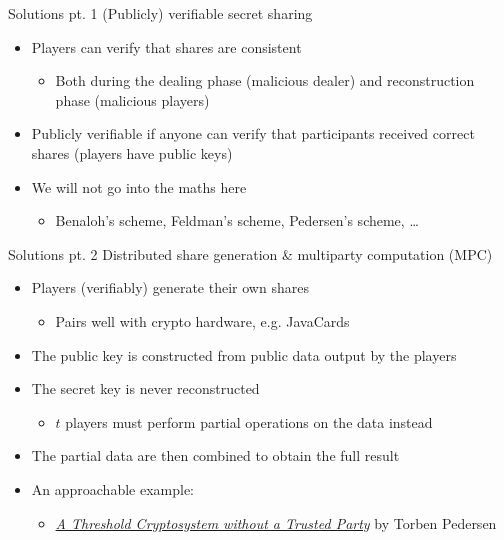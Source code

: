 \begin{frame}{Solutions pt. 1}
  (Publicly) verifiable secret sharing
  \begin{itemize}[<+(1)->]
    \item Players can verify that shares are consistent
    \par
    \begin{itemize}
      \item Both during the dealing phase (malicious dealer) and reconstruction phase (malicious players)
    \end{itemize}
    \item Publicly verifiable if anyone can verify that participants received correct shares (players have public keys)
    \item We will not go into the maths here
    \par
    \begin{itemize}
      \item Benaloh's scheme, Feldman's scheme, Pedersen's scheme, \dots
    \end{itemize}
  \end{itemize}
\end{frame}

\begin{frame}{Solutions pt. 2}
  Distributed share generation \& multiparty computation (MPC)
  \begin{itemize}[<+(1)->]
    \item Players (verifiably) generate their own shares
    \begin{itemize}
      \item Pairs well with crypto hardware, e.g. JavaCards
    \end{itemize}
    \item The public key is constructed from public data output by the players
    \item The secret key is never reconstructed
    \par
    \begin{itemize}
      \item $t$ players must perform partial operations on the data instead
    \end{itemize}
    \item The partial data are then combined to obtain the full result
    \item An approachable example:
    \par
    \begin{itemize}
      \item \href{https://link.springer.com/chapter/10.1007/3-540-46416-6_47}{\textit{A Threshold Cryptosystem without a Trusted Party}} by Torben Pedersen
    \end{itemize}
  \end{itemize}
\end{frame}

